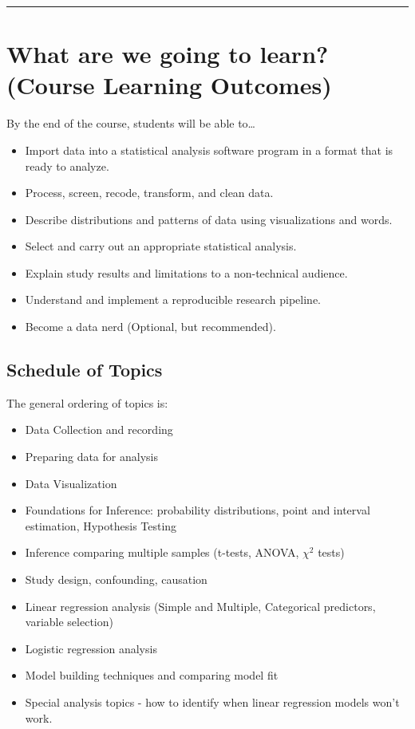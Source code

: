 \documentclass[
  letterpaper,
  DIV=11,
  numbers=noendperiod]{scrartcl}
\providecommand{\tightlist}{%
  \setlength{\itemsep}{0pt}\setlength{\parskip}{0pt}}\usepackage{longtable,booktabs,array}
\begin{document}
\begin{center}\rule{0.5\linewidth}{0.5pt}\end{center}

\hypertarget{what-are-we-going-to-learn-course-learning-outcomes}{%
\section{What are we going to learn? (Course Learning
Outcomes)}\label{what-are-we-going-to-learn-course-learning-outcomes}}

By the end of the course, students will be able to\ldots{}

\begin{itemize}
\tightlist
\item
  Import data into a statistical analysis software program in a format
  that is ready to analyze.
\item
  Process, screen, recode, transform, and clean data.
\item
  Describe distributions and patterns of data using visualizations and
  words.
\item
  Select and carry out an appropriate statistical analysis.
\item
  Explain study results and limitations to a non-technical audience.
\item
  Understand and implement a reproducible research pipeline.
\item
  Become a data nerd (Optional, but recommended).
\end{itemize}

\hypertarget{schedule-of-topics}{%
\subsection{Schedule of Topics}\label{schedule-of-topics}}

The general ordering of topics is:

\begin{itemize}
\tightlist
\item
  Data Collection and recording
\item
  Preparing data for analysis
\item
  Data Visualization
\item
  Foundations for Inference: probability distributions, point and
  interval estimation, Hypothesis Testing
\item
  Inference comparing multiple samples (t-tests, ANOVA, \(\chi^{2}\)
  tests)
\item
  Study design, confounding, causation
\item
  Linear regression analysis (Simple and Multiple, Categorical
  predictors, variable selection)
\item
  Logistic regression analysis
\item
  Model building techniques and comparing model fit
\item
  Special analysis topics - how to identify when linear regression
  models won't work.
\end{itemize}
\end{document}
